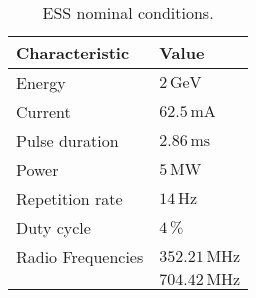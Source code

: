 \begin{table}[ht]
  \centering
  \caption[ESS nominal conditions]
  {ESS nominal conditions.}
  \label{chap2:ess_charac}
  \begin{tabular}{ll}
    \toprule
    Characteristic    & Value                  \\
    \midrule
    Energy            & $2\,\mathrm{GeV}$      \\
    Current           & $62.5\,\mathrm{mA}$    \\
    Pulse duration    & $2.86\,\mathrm{ms}$    \\
    Power             & $5\,\mathrm{MW}$       \\
    Repetition rate   & $14\,\mathrm{Hz}$      \\
    Duty cycle        & $4\,\mathrm{\%}$       \\
    Radio Frequencies & $352.21\,\mathrm{MHz}$ \\
                      & $704.42\,\mathrm{MHz}$ \\
    \bottomrule
  \end{tabular}
\end{table}